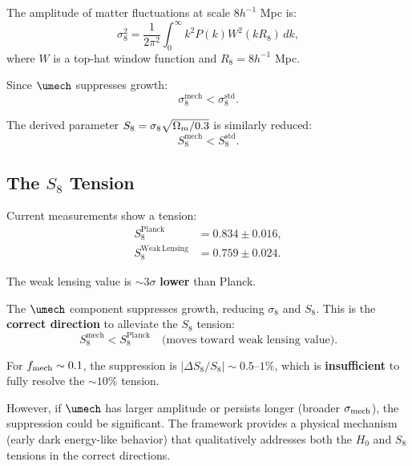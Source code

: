 The amplitude of matter fluctuations at scale $8 h^{-1}$ Mpc is:
\begin{equation}
\sigma_8^2 = \frac{1}{2\pi^2}\int_0^\infty k^2 P(k) W^2(kR_8) \, dk,
\end{equation}
where $W$ is a top-hat window function and $R_8 = 8 h^{-1}$ Mpc.

Since $\umech$ suppresses growth:
\begin{equation}
\sigma_8^{\mathrm{mech}} < \sigma_8^{\mathrm{std}}.
\end{equation}

The derived parameter $S_8 = \sigma_8\sqrt{\Omega_m/0.3}$ is similarly reduced:
\begin{equation}
S_8^{\mathrm{mech}} < S_8^{\mathrm{std}}.
\end{equation}

\subsection{The $S_8$ Tension}
\label{sec:S8_tension}

Current measurements show a tension:
\begin{align}
S_8^{\mathrm{Planck}} &= 0.834 \pm 0.016, \\
S_8^{\mathrm{Weak\,Lensing}} &= 0.759 \pm 0.024.
\end{align}

The weak lensing value is $\sim 3\sigma$ \textbf{lower} than Planck.

\begin{proposition}
\label{prop:S8_tension}
The $\umech$ component suppresses growth, reducing $\sigma_8$ and $S_8$. This is the \textbf{correct direction} to alleviate the $S_8$ tension:
\begin{equation}
S_8^{\mathrm{mech}} < S_8^{\mathrm{Planck}} \quad \text{(moves toward weak lensing value)}.
\end{equation}

For $f_{\mathrm{mech}} \sim 0.1$, the suppression is $|\Delta S_8/S_8| \sim 0.5$--$1\%$, which is \textbf{insufficient} to fully resolve the $\sim 10\%$ tension.

However, if $\umech$ has larger amplitude or persists longer (broader $\sigma_{\mathrm{mech}}$), the suppression could be significant. The framework provides a physical mechanism (early dark energy-like behavior) that qualitatively addresses both the $H_0$ and $S_8$ tensions in the correct directions.
\end{proposition}


